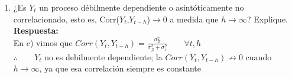\documentclass[12pt,letterpaper]{article}
\begin{document}
\begin{enumerate}
\begin{enumerate}
        \item ¿Es $Y_{t}$ un proceso débilmente dependiente o asintóticamente no correlacionado, esto es, Corr($Y_{t}$,$Y_{t-h}$)$\rightarrow 0$ a medida que $h\rightarrow \infty$? Explique.
        \\
        \textbf{Respuesta:}
        \\
        En c) vimos que $Corr(Y_{t},Y_{t-h})=\frac{\sigma_{Z}^{2}}{\sigma_{Z}^{2}+\sigma_{\varepsilon}^{2}} \quad \quad \forall t,h$
        \\
        $\therefore\quad \quad Y_{t}$ no es debilmente dependiente; la $Corr(Y_{t},Y_{t-h})\nrightarrow0$ cuando $h\rightarrow\infty$, ya que esa correlación siempre es constante
    \end{enumerate}




\end{enumerate}
\end{document}
